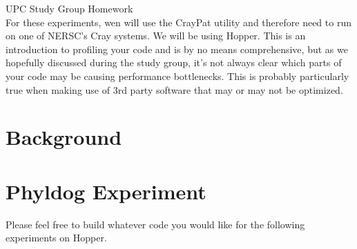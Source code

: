 \documentclass{article}
\begin{document}
UPC Study Group Homework\\
For these experiments, wen will use the CrayPat utility and therefore need to run on one of NERSC's Cray systems.  We will be using Hopper.  This is an introduction to profiling your code and is by no means comprehensive, but as we hopefully discussed during the study group, it's not always clear which parts of your code may be causing performance bottlenecks.  This is probably particularly true when making use of 3rd party software that may or may not be optimized.  

\section{Background}
 
\section{Phyldog Experiment}
Please feel free to build whatever code you would like for the following experiments on Hopper.  
\end{document}
